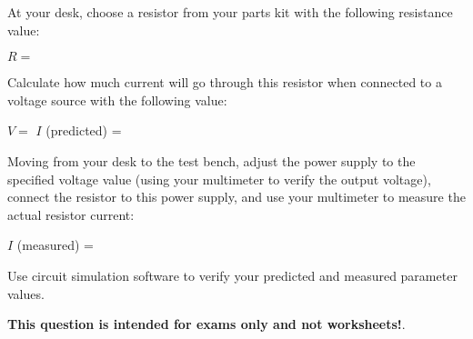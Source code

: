 

At your desk, choose a resistor from your parts kit with the following resistance value:

\vskip 10pt

$R = $ \underbar{\hskip 100pt}

\vskip 10pt

Calculate how much current will go through this resistor when connected to a voltage source with the following value:

\vskip 10pt

$V = $ \underbar{\hskip 100pt} \hskip 100pt $I$ (predicted) = \underbar{\hskip 100pt}

\vskip 10pt

Moving from your desk to the test bench, adjust the power supply to the specified voltage value (using your multimeter to verify the output voltage), connect the resistor to this power supply, and use your multimeter to measure the actual resistor current:

\vskip 10pt

\hskip 225pt $I$ (measured) = \underbar{\hskip 100pt}







Use circuit simulation software to verify your predicted and measured parameter values.







{\bf This question is intended for exams only and not worksheets!}.



